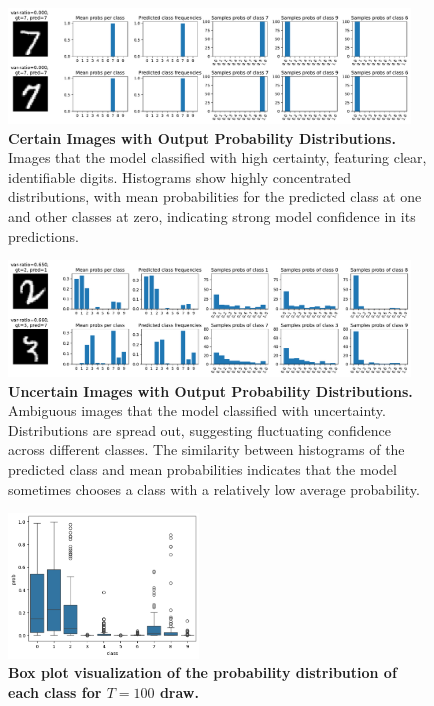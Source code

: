 \begin{figure}[H]
    \centering
    \includegraphics[width=0.95\textwidth]{var-ratio_certain_images.pdf}
    \caption{\textbf{Certain Images with Output Probability Distributions.} Images that the model classified with high certainty, featuring clear, identifiable digits. Histograms show highly concentrated distributions, with mean probabilities for the predicted class at one and other classes at zero, indicating strong model confidence in its predictions.}
    \label{fig:varratio_certain}
\end{figure}
\begin{figure}[H]
    \centering
    \includegraphics[width=0.95\textwidth]{var-ratio_uncertain_images.pdf}
    \caption{\textbf{Uncertain Images with Output Probability Distributions.} Ambiguous images that the model classified with uncertainty. Distributions are spread out, suggesting fluctuating confidence across different classes. The similarity between histograms of the predicted class and mean probabilities indicates that the model sometimes chooses a class with a relatively low average probability.}
    \label{fig:varratio_uncertain}
\end{figure}
\begin{figure}[H]
    \centering
    \includegraphics[width=0.45\textwidth]{proba_barplot.png}
    \caption{\textbf{Box plot visualization of the probability distribution of each class for $ T=100 $ draw.}}
    \label{fig:proba_barplot}
\end{figure}

